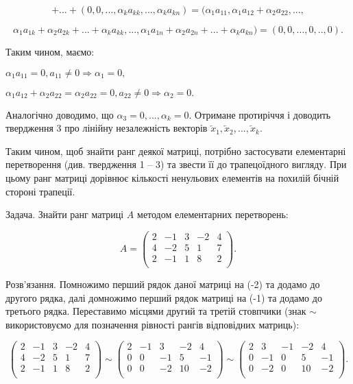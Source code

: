 $$	+ ...
	+ (0, 0, ..., \alpha_k a_{kk}, ..., \alpha_k a_{kn})
= (\alpha_1 a_{11}, \alpha_1 a_{12} + \alpha_2 a_{22}, ..., $$

$$\alpha_1 a_{1k } + \alpha_2 a_{2k} + ... + \alpha_k a_{kk}, ..., \alpha_1 a_{1n} + \alpha_2 a_{2n} + ... + \alpha_k a_{kn})
= (0, 0, ..., 0, .., 0).$$


Таким чином, маємо:

$\alpha_1 a_{11} = 0, a_{11} \neq 0 \Rightarrow \alpha_1 = 0,$

$\alpha_1 a_{12} + \alpha_2 a_{22} = \alpha_2 a_{22} = 0, a_{22} \neq 0 \Rightarrow \alpha_2 = 0.$

Аналогічно доводимо, що $\alpha_3 = 0, ..., \alpha_k = 0$. Отримане протиріччя і доводить
твердження 3 про лінійну незалежність векторів $\overleftarrow{x}_1, \overleftarrow{x}_2, ..., \overleftarrow{x}_k$.

Таким чином, щоб знайти ранг деякої матриці, потрібно застосувати
елементарні перетворення (див. твердження 1 – 3) та звести її до трапецоїдного
вигляду. При цьому ранг матриці дорівнює кількості ненульових елементів на
похилій бічній стороні трапеції.


Задача. Знайти ранг матриці $A$ методом елементарних перетворень:

$$A = \begin{pmatrix}
	2 & -1 & 3 & -2 & 4 \\
	4 & -2 & 5 &  1 & 7 \\
	2 & -1 & 1 &  8 & 2 \\
\end{pmatrix}.$$


Розв’язання. Помножимо перший рядок даної матриці на (-2) та додамо до
другого рядка, далі домножимо перший рядок матриці на (-1) та додамо до
третього рядка. Переставимо місцями другий та третій стовпчики (знак $\sim$
використовуємо для позначення рівності рангів відповідних матриць):

$$\begin{pmatrix}
	2 & -1 & 3 & -2 & 4 \\
	4 & -2 & 5 &  1 & 7 \\
	2 & -1 & 1 &  8 & 2 \\
\end{pmatrix} \sim \begin{pmatrix}
	2 & -1 &  3 & -2 &  4 \\
	0 &  0 & -1 &  5 & -1 \\
	0 &  0 & -2 & 10 & -2 \\
\end{pmatrix} \sim \begin{pmatrix}
	2 &  3 & -1 & -2 &  4 \\
	0 & -1 &  0 &  5 & -1 \\
	0 & -2 &  0 & 10 & -2 \\
\end{pmatrix}.$$


